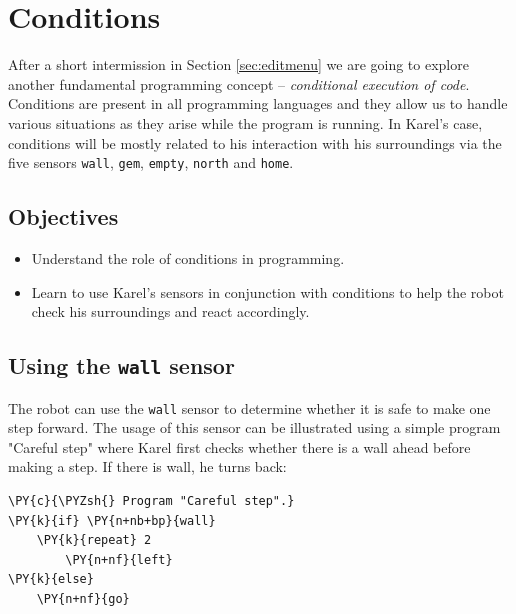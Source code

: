 
\section{Conditions} \label{sec:cond}

After a short intermission in Section \ref{sec:editmenu} we are going to explore
another fundamental programming concept -- {\em conditional execution of code}. Conditions 
are present in all programming languages and they allow us to 
handle various situations as they arise while the program is running. In Karel's case, conditions 
will be mostly related to his interaction with his surroundings via the five sensors
{\tt wall}, {\tt gem}, {\tt empty}, {\tt north} and {\tt home}.

\subsection{Objectives} 

\begin{itemize}
\item Understand the role of conditions in programming.
\item Learn to use Karel's sensors in conjunction with conditions to help the robot
      check his surroundings and react accordingly. 
\end{itemize}

\subsection{Using the {\tt wall} sensor}

The robot can use the {\tt wall} sensor to determine 
whether it is safe to make one step forward.
The usage of this sensor can be illustrated 
using a simple program "Careful step" 
where Karel first checks whether there is a wall ahead before
making a step. If there is wall, he turns back:\\

\begin{bbox}
\begin{Verbatim}[commandchars=\\\{\}]
\PY{c}{\PYZsh{} Program "Careful step".}
\PY{k}{if} \PY{n+nb+bp}{wall}
    \PY{k}{repeat} 2
        \PY{n+nf}{left}
\PY{k}{else}
    \PY{n+nf}{go}
\end{Verbatim}
\end{bbox}
\vspace{6mm}

